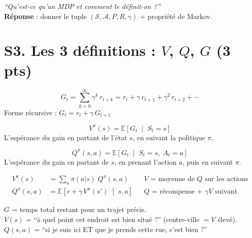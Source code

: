 \documentclass[11pt,a4paper]{article}
\newcommand{\E}{\mathbb{E}}
\begin{document}
\begin{exambox}
\textit{``Qu'est-ce qu'un MDP et comment le définit-on ?''}\\[4pt]
\textbf{Réponse} : donner le tuple $(\mathcal{S}, \mathcal{A}, P, R, \gamma)$ + propriété de Markov.
\end{exambox}

\section[S3. Les 3 definitions V, Q, G (3 pts)]{S3. Les 3 définitions : $V$, $Q$, $G$ (3 pts)}

\begin{formbox}
$$\boxed{G_t = \sum_{k=0}^{\infty} \gamma^k \, r_{t+k} = r_t + \gamma \, r_{t+1} + \gamma^2 \, r_{t+2} + \cdots}$$
Forme récursive : $G_t = r_t + \gamma \, G_{t+1}$
\end{formbox}

\begin{formbox}
$$\boxed{V^\pi(s) = \E\!\left[G_t \;\middle|\; S_t = s\right]}$$
L'espérance du gain en partant de l'état $s$, en suivant la politique $\pi$.
\end{formbox}

\begin{formbox}
$$\boxed{Q^\pi(s,a) = \E\!\left[G_t \;\middle|\; S_t = s,\; A_t = a\right]}$$
L'espérance du gain en partant de $s$, en prenant l'action $a$, puis en suivant $\pi$.
\end{formbox}

\begin{formbox}
\begin{align*}
V^\pi(s) &= \sum_a \pi(a|s) \; Q^\pi(s,a) && \text{$V$ = moyenne de $Q$ sur les actions}\\
Q^\pi(s,a) &= \E\!\left[r + \gamma \, V^\pi(s') \;\middle|\; s, a\right] && \text{$Q$ = récompense + $\gamma V$ suivant}
\end{align*}
\end{formbox}

\begin{exbox}
$G$ = temps total restant pour un trajet précis.\\
$V(s)$ = ``à quel point cet endroit est bien situé ?'' (centre-ville $= V$ élevé).\\
$Q(s, a)$ = ``si je suis ici ET que je prends cette rue, c'est bien ?''
\end{exbox}
\end{document}
